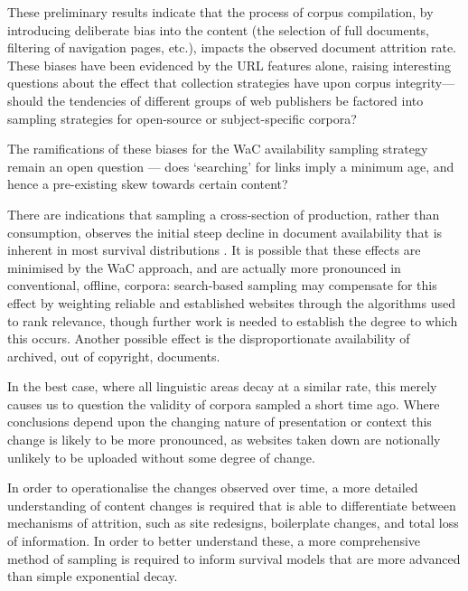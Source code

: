 These preliminary results indicate that the process of corpus compilation, by introducing deliberate bias into the content  (the selection of full documents, filtering of navigation pages, etc.), impacts the observed document attrition rate.  These biases have been evidenced by the URL features alone, raising interesting questions about the effect that collection strategies have upon corpus integrity---should the tendencies of different groups of web publishers be factored into sampling strategies for open-source or subject-specific corpora?

The ramifications of these biases for the WaC availability sampling strategy remain an open question --- does `searching' for links imply a minimum age, and hence a pre-existing skew towards certain content?

There are indications that sampling a cross-section of production, rather than consumption, observes the initial steep decline in document availability that is inherent in most survival distributions%
.  It is possible that these effects are minimised by the WaC approach, and are actually more pronounced in conventional, offline, corpora: search-based sampling may compensate for this effect by weighting reliable and established websites through the algorithms used to rank relevance, though further work is needed to establish the degree to which this occurs.  Another possible effect is the disproportionate availability of archived, out of copyright, documents.



In the best case, where all linguistic areas decay at a similar rate, this merely causes us to question the validity of corpora sampled a short time ago.  Where conclusions depend upon the changing nature of presentation or context this change is likely to be more pronounced, as websites taken down are notionally unlikely to be uploaded without some degree of change.

In order to operationalise the changes observed over time, a more detailed understanding of content changes is required that is able to differentiate between mechanisms of attrition, such as site redesigns, boilerplate changes, and total loss of information.  In order to better understand these, a more comprehensive method of sampling is required to inform survival models that are more advanced than simple exponential decay.


